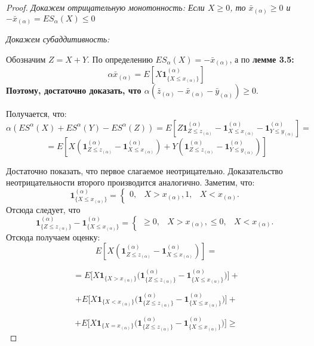 \documentclass[14pt,a4paper]{article}
\theoremstyle{plain}
\theoremstyle{definition}
\begin{document}
\begin{proof}

\hspace{20pt} \it Докажем отрицательную монотонность:\rm
Если $X \ge 0$,
то $\bar{x}_{(\alpha)} \ge 0$ и $-\bar{x}_{(\alpha)} = ES_\alpha(X) \le 0$


\hspace{20pt} \it Докажем субаддитивность:\rm

Обозначим $Z = X+Y$.
По определению $ES_\alpha (X) = -\bar{x}_{(\alpha)}$, а по \bf{лемме 3.5: }\rm $$\alpha\bar{x}_{(\alpha)} = E[X \mathbf{1}^{(\alpha)}_{\{X \le x_{(\alpha)}  \}}]$$
Поэтому, достаточно доказать, что $\alpha(\bar{z}_{(\alpha)} - \bar{x}_{(\alpha)} - \bar{y}_{(\alpha)}) \ge 0.$

Получается, что:
$$
\alpha(ES^\alpha(X)+ES^\alpha(Y)-ES^\alpha(Z)) = E[Z\mathbf{1}^{(\alpha)}_{Z\le z_{(\alpha)}}-\mathbf{1}^{(\alpha)}_{X\le x_{(\alpha)}}-\mathbf{1}^{(\alpha)}_{Y\le y_{(\alpha)}}]=
$$
$$
= E[X(\mathbf{1}^{(\alpha)}_{Z\le z_{(\alpha)}} - \mathbf{1}^{(\alpha)}_{X\le x_{(\alpha)}})+Y(\mathbf{1}^{(\alpha)}_{Z\le z_{(\alpha)}} - \mathbf{1}^{(\alpha)}_{Y\le y_{(\alpha)}})]
$$

Достаточно показать, что первое слагаемое неотрицательно.
Доказательство неотрицательности второго производится аналогично.
Заметим, что:
$$
\mathbf{1}^{(\alpha)}_{\{X \le x_{(\alpha)}  \}}=
\left\{\begin{matrix}
0, &X > x_{(\alpha)},
1, &X < x_{(\alpha)}.
\end{matrix}\right.
$$
Отсюда следует, что
$$
\mathbf{1}^{(\alpha)}_{\{Z \le z_{(\alpha)}  \}} - \mathbf{1}^{(\alpha)}_{\{X \le x_{(\alpha)}  \}}=
\left\{\begin{matrix}
\ge 0, &X > x_{(\alpha)},
\le 0, &X < x_{(\alpha)}.
\end{matrix}\right.
$$
Отсюда получаем оценку:
$$
E[X(\mathbf{1}^{(\alpha)}_{Z\le z_{(\alpha)}} - \mathbf{1}^{(\alpha)}_{X\le x_{(\alpha)}})] =
$$

$$
=E\Big[X\mathbf{1}_{\{X > x_{(\alpha)}\}}\big(\mathbf{1}^{(\alpha)}_{\{Z \le z_{(\alpha)}  \}} - \mathbf{1}^{(\alpha)}_{\{X \le x_{(\alpha)}  \}}  \big) \Big]+
$$

$$
+E\Big[X\mathbf{1}_{\{X < x_{(\alpha)}\}}\big(\mathbf{1}^{(\alpha)}_{\{Z \le z_{(\alpha)}  \}} - \mathbf{1}^{(\alpha)}_{\{X \le x_{(\alpha)}  \}}  \big) \Big]+
$$

$$
+E\Big[X\mathbf{1}_{\{X = x_{(\alpha)}\}}\big(\mathbf{1}^{(\alpha)}_{\{Z \le z_{(\alpha)}  \}} - \mathbf{1}^{(\alpha)}_{\{X \le x_{(\alpha)}  \}}  \big) \Big] \ge
$$


\end{proof}
\end{document}
